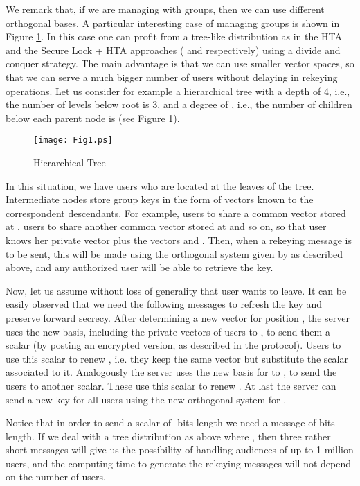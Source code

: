 \documentclass[a4paper,11pt]{amsart}
\theoremstyle{definition}
\begin{document}
We remark that, if we are managing with  groups, then we can use
 different orthogonal bases.  A particular interesting case of
managing groups is shown in Figure \ref{fig:tree}. In this case one
can profit from a tree-like distribution as in the HTA and the Secure
Lock + HTA approaches (\cite{RFC:2627} and \cite{1039707}
respectively) using a divide and conquer
strategy. The main advantage is that we can use smaller vector spaces, so that
we can serve a much bigger number of users without delaying in
rekeying operations. Let us consider for example a hierarchical tree with a depth of 4,
i.e., the number of levels below root is 3, and a degree of , i.e.,
the number of children below each parent node is  (see Figure 1).
\begin{figure}
  \begin{center}

\texttt{[image: Fig1.ps]}
\caption{Hierarchical Tree}
    \label{fig:tree}
\end{center}
\end{figure}
In this situation, we have  users who are located at the leaves
of the tree. Intermediate nodes store group keys in the form of
vectors known to the correspondent descendants. For example, users 
to  share a common vector stored at , users  to  share
another common vector stored at  and so on, so that user 
knows her private vector plus the vectors  and . Then,
when a rekeying message is to be sent, this will be made using the
orthogonal system given by  as described above,
and any authorized user will be able to retrieve the key.

Now, let us assume without loss of generality that user  wants to
leave. It can be easily observed that we need the following messages
to refresh the key and preserve forward secrecy.  After determining a
new vector for position , the server uses the new basis, including
the private vectors of users  to , to send them a scalar (by
posting an encrypted version, as described in the protocol). Users 
to  use this scalar to renew , i.e. they keep the same
vector but substitute the scalar associated to it. Analogously the
server uses the new basis for  to , to send the
users  to  another scalar. These use this scalar to renew
. At last the server can send a new key for all users using the
new orthogonal system for .

Notice that in order to send a scalar of -bits length we need a
message of  bits length. If we deal with a tree distribution as
above where , then three rather short messages will give us the
possibility of handling audiences of up to 1 million users, and the
computing time to generate the rekeying messages will not depend on
the number of users.
\end{document}
